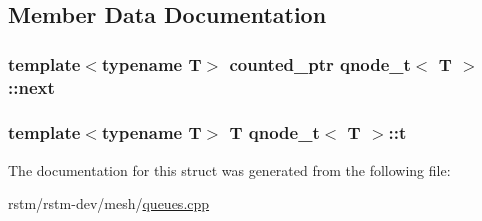 \subsection{Member Data Documentation}
\hypertarget{structqnode__t_a2f0dc7e582ce26c4df540194817acfaf}{
\subsubsection[{next}]{\setlength{\rightskip}{0pt plus 5cm}template$<$typename T$>$ {\bf counted\-\_\-ptr} {\bf qnode\-\_\-t}$<$ T $>$\-::next}}\label{structqnode__t_a2f0dc7e582ce26c4df540194817acfaf}
\hypertarget{structqnode__t_af5debc0e6634705fb1617f9d8e324fc1}{
\subsubsection[{t}]{\setlength{\rightskip}{0pt plus 5cm}template$<$typename T$>$ T {\bf qnode\-\_\-t}$<$ T $>$\-::t}}\label{structqnode__t_af5debc0e6634705fb1617f9d8e324fc1}


The documentation for this struct was generated from the following file\-:\begin{DoxyCompactItemize}
\item 
rstm/rstm-\/dev/mesh/\hyperlink{queues_8cpp}{queues.\-cpp}\end{DoxyCompactItemize}

